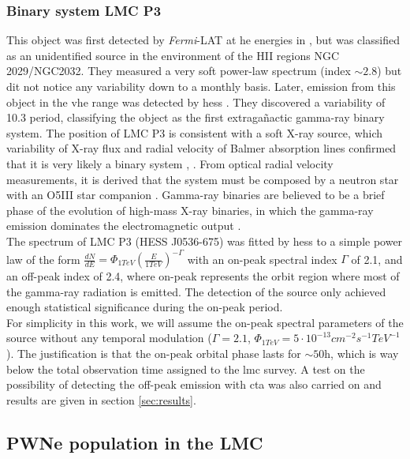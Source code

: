 \documentclass[main.tex]{subfiles}
\begin{document}
\subsubsection{Binary system LMC P3}

This object was first detected by \textit{Fermi}-LAT at \gls{he} energies in \cite{2016LMCFermiLAT}, but was classified as an unidentified source in the environment of the HII regions NGC 2029/NGC2032. They measured a very soft power-law spectrum (index $\sim 2.8$) but dit not notice any variability down to a monthly basis.
Later, emission from this object in the \gls{vhe} range was detected by \gls{hess} \cite{2017HESSLMCP3}. They discovered a variability of 10.3 period, classifying the object as the first extragañactic gamma-ray binary system. The position of LMC P3 is consistent with a soft X-ray source, which variability of X-ray flux and radial velocity of Balmer absorption lines confirmed that it is very likely a binary system \cite{1981softXraysLMC}, \cite{2012xraybinaryP3}. From optical radial velocity measurements, it is derived that the system must be composed by a neutron star with an O5III star companion \cite{2016P3binary}. Gamma-ray binaries are believed to be a brief phase of the evolution of high-mass X-ray binaries, in which the gamma-ray emission dominates the electromagnetic output \cite{1989binaries}.\\
The spectrum of LMC P3 (HESS J0536-675) was fitted by \gls{hess} to a simple power law of the form $\frac{dN}{dE} = \Phi_{1TeV}\left( \frac{E}{1TeV}\right)^{-\Gamma}$ with an on-peak spectral index $\Gamma$ of 2.1, and an off-peak index of 2.4, where on-peak represents the orbit region where most of the gamma-ray radiation is emitted. The detection of the source only achieved enough statistical significance during the on-peak period.\\
For simplicity in this work, we will assume the on-peak spectral parameters of the source without any temporal modulation ($\Gamma=2.1$, $\Phi_{1TeV} = 5 \cdot 10^{-13}cm^{-2}s^{-1}TeV^{-1}$). The justification is that the on-peak orbital phase lasts for $\sim 50$h, which is way below the total observation time assigned to the \gls{lmc} survey. A test on the possibility of detecting the off-peak emission with \gls{cta} was also carried on and results are given in section \ref{sec:results}.

\subsection{PWNe population in the LMC}\label{sec:pwnepop}
\end{document}
